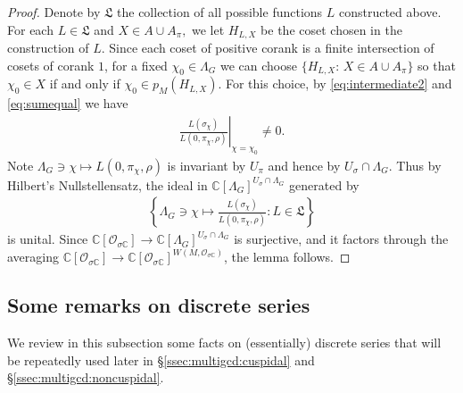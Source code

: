 \documentclass[10pt]{amsart}
\theoremstyle{definition}
\numberwithin{equation}{section}
\numberwithin{equation}{subsection}
\newcommand{\CC}{\mathbb{C}}
\begin{document}
\begin{proof}
     Denote by $\mathfrak{L}$ the collection of all possible functions $L$ constructed above. For each $L\in \mathfrak{L}$ and $X\in A\cup A_\pi,$ we let $H_{L,X}$ be the coset chosen in the construction of $L$. Since each coset of positive corank is a finite intersection of cosets of corank $1$, for a fixed $\chi_0\in\Lambda_G$ we can choose $\{H_{L,X}:\,X\in A\cup A_\pi\}$ so that $\chi_0 \in X$ if and only if $\chi_0\in p_M(H_{L,X})$. For this choice, by \eqref{eq:intermediate2} and \eqref{eq:sumequal} we have
     \begin{align*}
         \left.\frac{L(\sigma_\chi)}{L(0,\pi_\chi,\rho)}\right|_{\chi=\chi_0} \neq 0.
     \end{align*} 
    Note $\Lambda_G\ni \chi\mapsto L(0,\pi_\chi,\rho)$ is invariant by $U_\pi$ and hence by $U_\sigma\cap \Lambda_G$. Thus by Hilbert's Nullstellensatz, the ideal in $\CC[\Lambda_G]^{U_\sigma\cap \Lambda_G}$ generated by
    \begin{align*}
        \left\{  \Lambda_G\ni\chi\mapsto \frac{L(\sigma_\chi)}{L(0,\pi_\chi,\rho)}: L\in \mathfrak{L}\right\}
    \end{align*}
    is unital. Since $\CC[\mathcal{O}_{\sigma\CC}]\longrightarrow \CC[\Lambda_G]^{U_\sigma\cap \Lambda_G}$ is surjective, and it factors through the averaging $\CC[\mathcal{O}_{\sigma\CC}]\to \CC[\mathcal{O}_{\sigma\CC}]^{W(M,\mathcal{O}_{\sigma\CC})}$, the lemma follows.
\end{proof}

\subsection{Some remarks on discrete series}\label{ssec:rem:discrete}

We review in this subsection some facts on (essentially) discrete series that will be repeatedly used later in \S \ref{ssec:multigcd:cuspidal} and \S \ref{ssec:multigcd:noncuspidal}.
\end{document}
